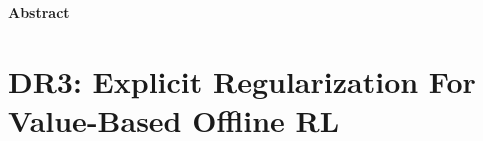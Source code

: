 \documentclass[../thesis.tex]{subfiles}
\begin{document}
\begin{AIbox}{\large{\textbf{Abstract}}}
\vspace{2mm}
\end{AIbox}




\vspace{-0.2cm}
\section{DR3: Explicit Regularization For Value-Based Offline RL}
\label{sec:dr3_section}
\vspace{-0.2cm}




% 
\end{document}
